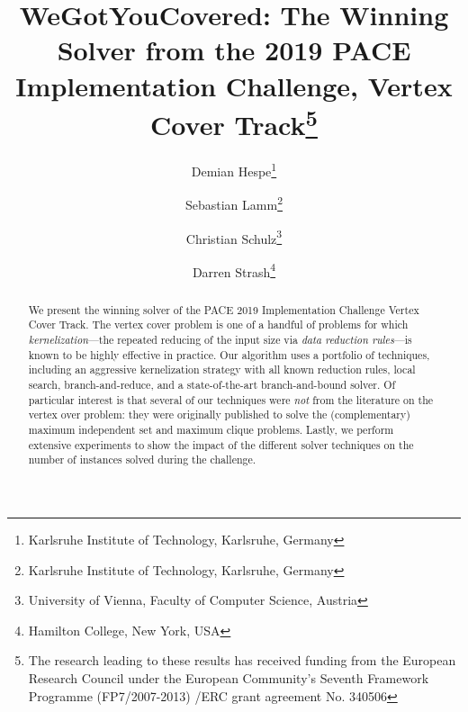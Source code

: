 \documentclass[twoside,leqno,twocolumn]{article}
\newcommand{\mytitle}{WeGotYouCovered: The Winning Solver from the 2019 PACE Implementation Challenge, Vertex Cover Track}
\begin{document}
\title{\mytitle\thanks{
    The research leading to these results has received funding from the European Research Council under the European Community's Seventh Framework Programme (FP7/2007-2013) /ERC grant agreement No. 340506}}
\author{Demian Hespe\thanks{Karlsruhe Institute of Technology, Karlsruhe, Germany} \and Sebastian Lamm\thanks{Karlsruhe Institute of Technology, Karlsruhe, Germany} \and Christian Schulz\thanks{University of Vienna, Faculty of Computer Science, Austria} \and Darren Strash\thanks{Hamilton College, New York, USA}}


\date{}


\maketitle
\begin{abstract}
We present the winning solver of the PACE 2019 Implementation Challenge Vertex Cover Track. The vertex cover problem is one of a handful of problems for which \emph{kernelization}---the repeated reducing of the input size via \emph{data reduction rules}---is known to be highly effective in practice. Our algorithm uses a portfolio of techniques, including an aggressive kernelization strategy with all known reduction rules, local search, branch-and-reduce, and a state-of-the-art branch-and-bound solver. Of particular interest is that several of our techniques were \emph{not} from the literature on the vertex over problem: they were originally published to solve the (complementary) maximum independent set and maximum clique problems. Lastly, we perform extensive experiments to show the impact of the different solver techniques on the number of instances solved during the challenge.
\end{abstract}

\end{document}
